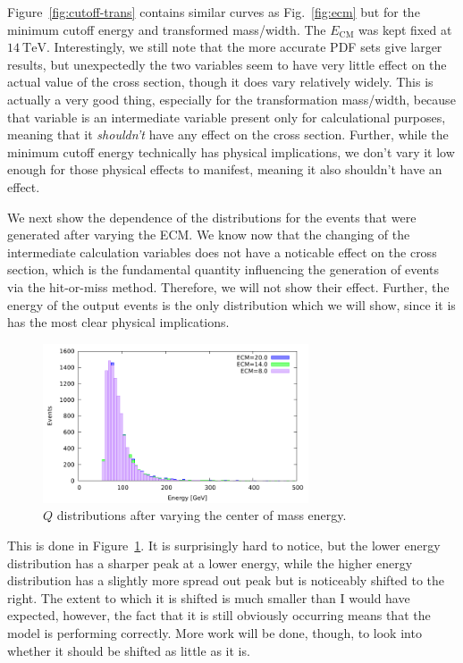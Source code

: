 Figure~\ref{fig:cutoff-trans} contains similar curves as Fig.~\ref{fig:ecm} but for the minimum cutoff energy and transformed mass/width. The $E_{\mathrm{CM}}$ was kept fixed at $\qty{14}{\tera\electronvolt}$. Interestingly, we still note that the more accurate PDF sets give larger results, but unexpectedly the two variables seem to have very little effect on the actual value of the cross section, though it does vary relatively widely. This is actually a very good thing, especially for the transformation mass/width, because that variable is an intermediate variable present only for calculational purposes, meaning that it \textit{shouldn't} have any effect on the cross section. Further, while the minimum cutoff energy technically has physical implications, we don't vary it low enough for those physical effects to manifest, meaning it also shouldn't have an effect.

We next show the dependence of the distributions for the events that were generated after varying the ECM. We know now that the changing of the intermediate calculation variables does not have a noticable effect on the cross section, which is the fundamental quantity influencing the generation of events via the hit-or-miss method. Therefore, we will not show their effect. Further, the energy of the output events is the only distribution which we will show, since it is has the most clear physical implications.

\begin{figure}[ht]
  \centering
  \includegraphics[width=0.7\textwidth]{./res/gfx/Q.pdf}
  \caption{$Q$ distributions after varying the center of mass energy.}
  \label{fig:q-dist}
\end{figure}

This is done in Figure~\ref{fig:q-dist}. It is surprisingly hard to notice, but the lower energy distribution has a sharper peak at a lower energy, while the higher energy distribution has a slightly more spread out peak but is noticeably shifted to the right. The extent to which it is shifted is much smaller than I would have expected, however, the fact that it is still obviously occurring means that the model is performing correctly. More work will be done, though, to look into whether it should be shifted as little as it is.

